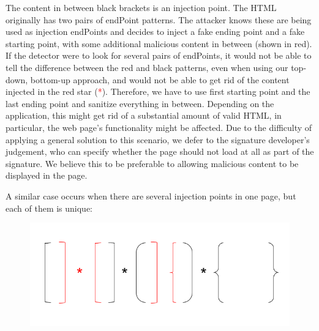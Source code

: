 The content in between black brackets is an injection point. The HTML originally has two pairs of endPoint patterns. The attacker knows these are being used as injection endPoints and decides to inject a fake ending point and a fake starting point, with some additional malicious content in between (shown in red). If the detector were to look for several pairs of endPoints, it would not be able to tell the difference between the red and black patterns, even when using our top-down, bottom-up approach, and would not be able to get rid of the content injected in the red star (\textcolor{red}{*}). Therefore, we have to use first starting point and the last ending point and sanitize everything in between. Depending on the application, this might get rid of a substantial amount of valid HTML, in particular, the web page's functionality might be affected. Due to the difficulty of applying a general solution to this scenario, we defer to the signature developer's judgement, who can specify whether the page should not load at all as part of the signature. We believe this to be preferable to allowing malicious content to be displayed in the page.

A similar case occurs when there are several injection points in one page, but each of them is unique:

\begin{figure}[h]
	\includegraphics[scale=0.4]{img/attacker_injection_unique.png}
	\label{fig:attacker_injection_unqiue}
\end{figure}

